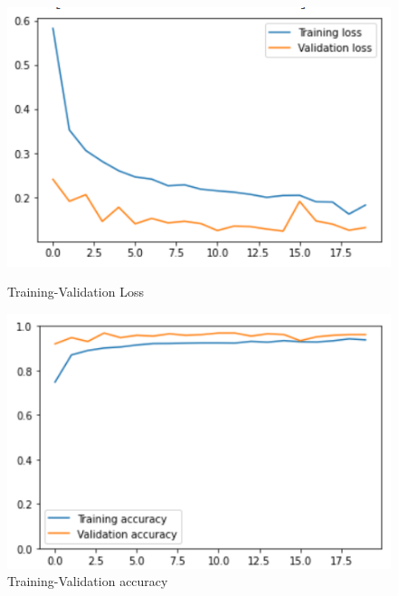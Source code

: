 \documentclass[11pt,a4paper]{article}
\theoremstyle{definition}
\begin{document}
\begin{figure}[H]
  \centering
  \begin{minipage}[b]{0.45\textwidth}
    \includegraphics[scale=0.75]{./images/xception1loss}
	\caption{Training-Validation Loss}
  \end{minipage}
  \hfill
  \begin{minipage}[b]{0.45\textwidth}
    \includegraphics[scale=0.75]{./images/xception1acc}
	\caption{Training-Validation accuracy}
  \end{minipage}
\end{figure}
\end{document}
